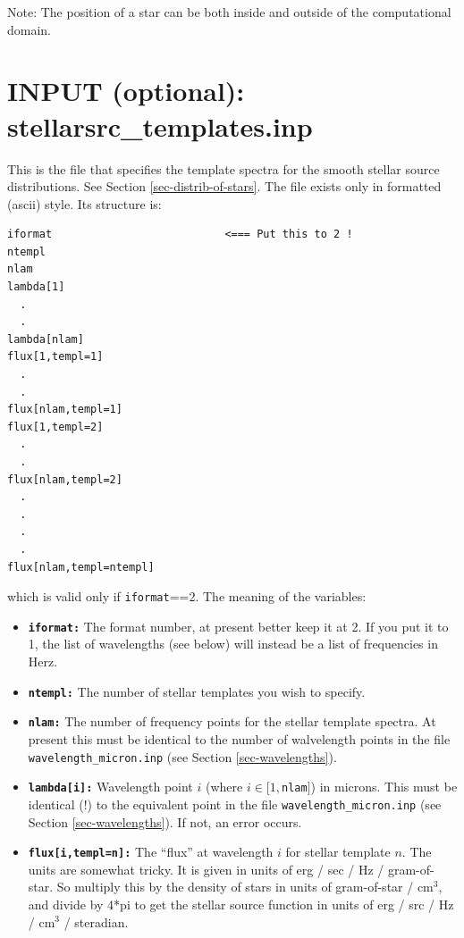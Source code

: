\documentclass{report}
\newenvironment{asciibox}%
  {\begin{list}{}{%
    \setlength{\topsep}{0.5em}%
    \setlength{\parskip}{0em}%
    \setlength{\parsep}{0em}%
    \setlength{\itemsep}{0em}%
    \setlength{\rightmargin}{0em}%
    \setlength{\leftmargin}{3.0em}%
    \setlength{\labelsep}{1em}%
    \setlength{\labelwidth}{2em}%
  }\normalfont\footnotesize\item}
  {\end{list}}
\begin{document}
Note: The position of a star can be both inside and outside of the 
computational domain.


\section{INPUT (optional): stellarsrc\_templates.inp}
\label{sec-stellarsrc-templates}
This is the file that specifies the template spectra for the smooth stellar
source distributions. See Section \ref{sec-distrib-of-stars}.
The file exists only in formatted (ascii) style. Its structure is:
\begin{asciibox}\begin{verbatim}
iformat                           <=== Put this to 2 !
ntempl
nlam
lambda[1]
  .
  .
lambda[nlam]
flux[1,templ=1]
  .
  .
flux[nlam,templ=1]
flux[1,templ=2]
  .
  .
flux[nlam,templ=2]
  .
  .
  .
  .
flux[nlam,templ=ntempl]
\end{verbatim}\end{asciibox}

which is valid only if {\small\tt iformat}==2. The meaning of the variables:
\begin{itemize}
\item[] {\small\tt\bf iformat:} The format number, at present better keep it at 2. 
  If you put it to 1, the list of wavelengths (see below) will instead be
  a list of frequencies in Herz. 
\item[] {\small\tt\bf ntempl:} The number of stellar templates you wish to specify.
\item[] {\small\tt\bf nlam:} The number of frequency points for the stellar
  template spectra. At present this must be identical to the number of
  walvelength points in the file {\small\tt wavelength\_micron.inp} (see
  Section \ref{sec-wavelengths}).
\item[] {\small\tt\bf lambda[i]:} Wavelength point $i$ (where $i\in
  [1,${\small\tt nlam}$]$) in microns. This must be identical (!) to the
  equivalent point in the file {\small\tt wavelength\_micron.inp} (see
  Section \ref{sec-wavelengths}). If not, an error occurs.
\item[] {\small\tt\bf flux[i,templ=n]:} The ``flux'' at wavelength $i$ for
  stellar template $n$. The units are somewhat tricky. It is given in units
  of erg / sec / Hz / gram-of-star. So multiply this by the density of
  stars in units of gram-of-star / cm$^3$, and divide by 4*pi to get the
  stellar source function in units of erg / src / Hz / cm$^3$ / steradian.
\end{itemize}
\end{document}
